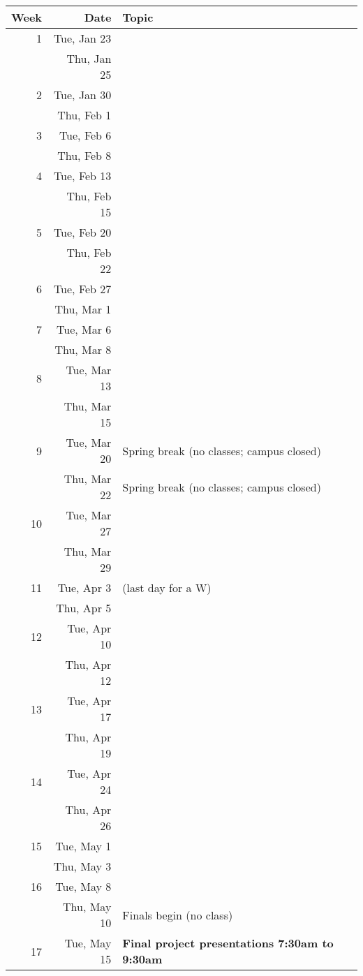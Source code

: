 \documentclass[11pt,onecolumn]{article}
\begin{document}
\begin{tabular}{r|r|p{5in}}
Week&Date&Topic\\\hline\hline
  1 & Tue, Jan 23 & \\
  \hline
    & Thu, Jan 25 & \\
  \hline
  2 & Tue, Jan 30 & \\
  \hline
    & Thu, Feb 1 & \\
    \hline
  3 & Tue, Feb 6 & \\
  \hline
    & Thu, Feb 8 & \\
      \hline
  4 & Tue, Feb 13 & \\
    \hline
    & Thu, Feb 15 & \\
        \hline
  5 & Tue, Feb 20 & \\
    \hline
    & Thu, Feb 22 & \\
        \hline
  6 & Tue, Feb 27 & \\
    \hline
    & Thu, Mar 1 & \\
        \hline
  7 & Tue, Mar 6 & \\
    \hline
    & Thu, Mar 8 & \\
        \hline
  8 & Tue, Mar 13 & \\
    \hline
    & Thu, Mar 15 & \\
          \hline
  9 & Tue, Mar 20 & Spring break (no classes; campus closed)\\
    \hline
    & Thu, Mar 22 & Spring break (no classes; campus closed)\\
        \hline
  10 & Tue, Mar 27 & \\
    \hline
    & Thu, Mar 29 & \\
        \hline
  11 & Tue, Apr 3 & (last day for a W)\\
    \hline
    & Thu, Apr 5 & \\
        \hline
  12 & Tue, Apr 10 & \\
    \hline
    & Thu, Apr 12 & \\
        \hline
  13 & Tue, Apr 17 & \\
    \hline
    & Thu, Apr 19 & \\
        \hline
  14 & Tue, Apr 24 & \\
    \hline
    & Thu, Apr 26 & \\
        \hline
  15 & Tue, May 1 & \\
    \hline
    & Thu, May 3 & \\
        \hline
  16 & Tue, May 8 & \\
    \hline
    & Thu, May 10 & Finals begin (no class)\\
        \hline
  17 & Tue, May 15 & \textbf{Final project presentations 7:30am to 9:30am}\\
    \hline

\end{tabular}
\end{document}
